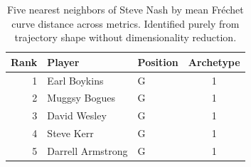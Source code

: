 \begin{table}[htbp]
  \centering\small
  \begin{tabular}{rllc}
    \toprule
    Rank & Player & Position & Archetype \\
    \midrule
    1 & Earl Boykins & G & 1 \\
    2 & Muggsy Bogues & G & 1 \\
    3 & David Wesley & G & 1 \\
    4 & Steve Kerr & G & 1 \\
    5 & Darrell Armstrong & G & 1 \\
    \bottomrule
  \end{tabular}
  \caption{Five nearest neighbors of Steve Nash by mean Fr\'{e}chet curve distance across metrics. Identified purely from trajectory shape without dimensionality reduction.}
  \label{tab:Steve_Nash_frechet_curve_neighbors}
\end{table}

